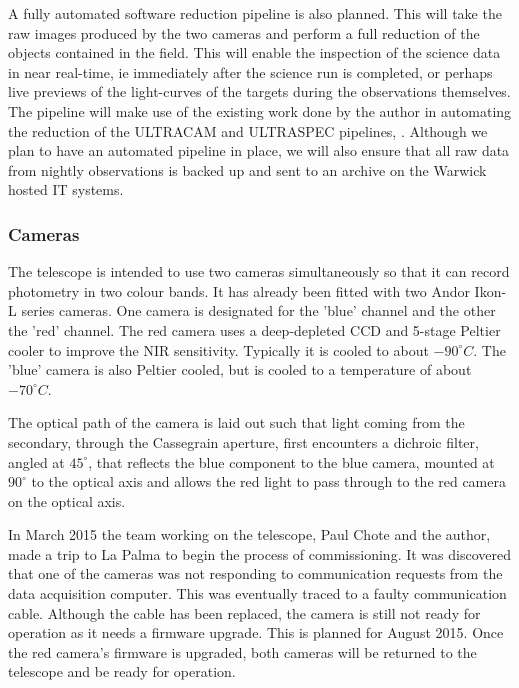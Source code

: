 \documentclass[a4paper,fleqn,usenatbib]{mnras}
\begin{document}
A fully automated software reduction pipeline is also planned. This will take the raw images produced by the two cameras and perform a full reduction of the objects contained in the field. This will enable the inspection of the science data in near real-time, ie immediately after the science run is completed, or perhaps live previews of the light-curves of the targets during the observations themselves. The pipeline will make use of the existing work done by the author in automating the reduction of the ULTRACAM and ULTRASPEC pipelines, \citep{RashleyMSC}. Although we plan to have an automated pipeline in place, we will also ensure that all raw data from nightly observations is backed up and sent to an archive on the Warwick hosted IT systems. 

\subsubsection{Cameras}
The telescope is intended to use two cameras simultaneously so that it can record photometry in two colour bands. It has already been fitted with two Andor Ikon-L series cameras. One camera is designated for the 'blue' channel and the other the 'red' channel. The red camera uses a deep-depleted CCD and 5-stage Peltier cooler to improve the NIR sensitivity. Typically it is cooled to about $-90^\circ C$. The 'blue' camera is also Peltier cooled, but is cooled to a temperature of about $-70^\circ C$.  

The optical path of the camera is laid out such that light coming from the secondary, through the Cassegrain aperture, first encounters a dichroic filter, angled at $45^\circ$, that reflects the blue component to the blue camera, mounted at $90^\circ$ to the optical axis and allows the red light to pass through to the red camera on the optical axis. 

In March 2015 the team working on the telescope, Paul Chote and the author, made a trip to La Palma to begin the process of commissioning. It was discovered that one of the cameras was not responding to communication requests from the data acquisition computer. This was eventually traced to a faulty communication cable. Although the cable has been replaced, the camera is still not ready for operation as it needs a firmware upgrade. This is planned for August 2015. Once the red camera's firmware is upgraded, both cameras will be returned to the telescope and be ready for operation. 
\end{document}
